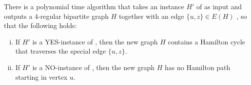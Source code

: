 \begin{lemma}
\label{le:Ham-to-Ham}
There is a polynomial time algorithm that takes an instance $H'$ of {\xxxHAM} as input and outputs 
a 4-regular bipartite graph $H$ together with an edge $\{u,z\}\in E(H)$ ,
so that the following holds:
\begin{enumerate}[(i)]
\item If $H'$ is a YES-instance of {\xxxHAM}, then the new graph $H$ contains a Hamilton cycle 
that traverses the special edge $\{u,z\}$.
\item If $H'$ is a NO-instance of {\xxxHAM}, then the new graph $H$ has no Hamilton path
starting in vertex $u$. 
\end{enumerate}
\end{lemma}

